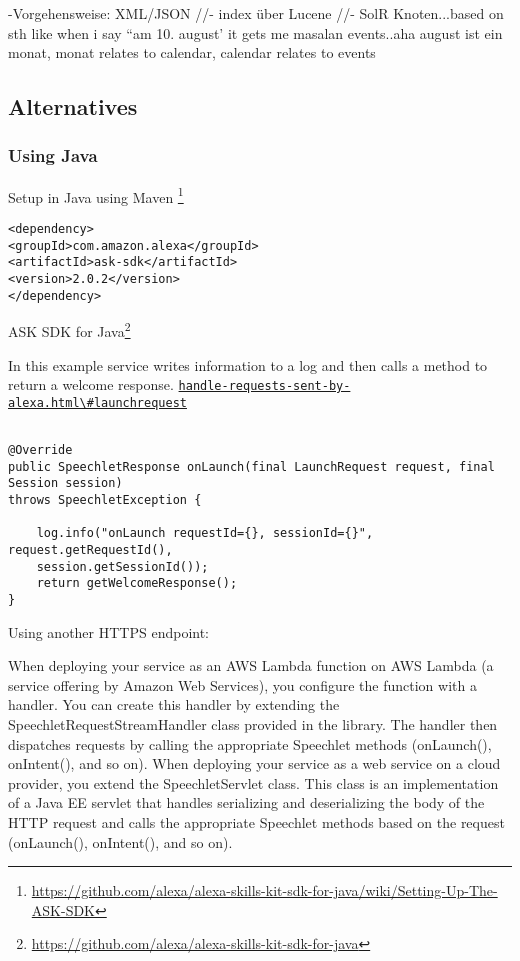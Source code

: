 -Vorgehensweise: XML/JSON //- index über Lucene //- SolR Knoten...based on sth like when i say  ``am 10. august'  it gets me masalan events..aha august ist ein monat, monat relates to calendar, calendar relates to events





\subsection*{Alternatives}


\subsubsection{Using Java}
Setup in Java using Maven \footnote{\url{https://github.com/alexa/alexa-skills-kit-sdk-for-java/wiki/Setting-Up-The-ASK-SDK}}

\begin{verbatim}
<dependency>
<groupId>com.amazon.alexa</groupId>
<artifactId>ask-sdk</artifactId>
<version>2.0.2</version>
</dependency>
\end{verbatim}

ASK SDK for Java\footnote{\url{https://github.com/alexa/alexa-skills-kit-sdk-for-java}}



In this example service writes information to a log and then calls a method to return a welcome response.
\href{https://developer.amazon.com/docs/custom-skills/handle-requests-sent-by-alexa.html\#launchrequest}{\lstinline|handle-requests-sent-by-alexa.html\#launchrequest|}
\begin{verbatim}

@Override
public SpeechletResponse onLaunch(final LaunchRequest request, final Session session)
throws SpeechletException {
	
	log.info("onLaunch requestId={}, sessionId={}", request.getRequestId(),
	session.getSessionId());
	return getWelcomeResponse();
}
\end{verbatim}



Using another HTTPS endpoint:

When deploying your service as an AWS Lambda function on AWS Lambda (a service offering by Amazon Web Services), you configure the function with a handler. You can create this handler by extending the SpeechletRequestStreamHandler class provided in the library. The handler then dispatches requests by calling the appropriate Speechlet methods (onLaunch(), onIntent(), and so on).
When deploying your service as a web service on a cloud provider, you extend the SpeechletServlet class. This class is an implementation of a Java EE servlet that handles serializing and deserializing the body of the HTTP request and calls the appropriate Speechlet methods based on the request (onLaunch(), onIntent(), and so on).




